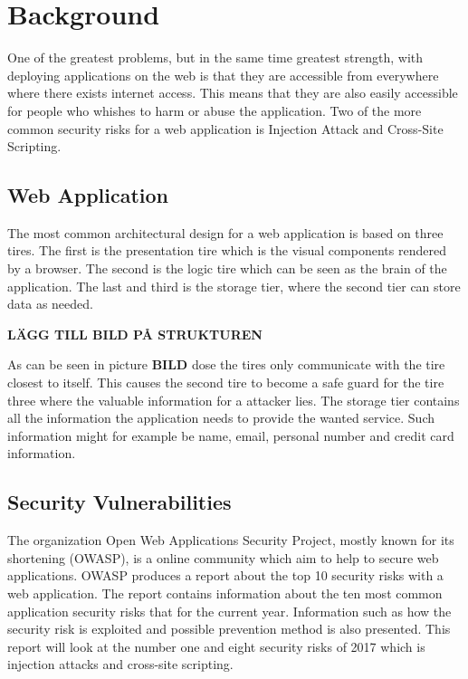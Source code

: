 \chapter{Background}
One of the greatest problems, but in the same time greatest strength, with deploying applications on the web is that they are accessible from everywhere where there exists internet access. This means that they are also easily accessible for people who whishes to harm or abuse the application. Two of the more common security risks for a web application is Injection Attack and Cross-Site Scripting. \parencite{OpenWebApplicationSecurityProject, CrossMichael2007Dgtw}


\section{Web Application}
The most common architectural design for a web application is based on three tires. The first is the presentation tire which is the visual components rendered by a browser. The second is the logic tire which can be seen as the brain of the application. The last and third is the storage tier, where the second tier can store data as needed. \parencite{JustinClarke-Salt2009SIAa} 

\textbf{LÄGG TILL BILD PÅ STRUKTUREN}

As can be seen in picture \textbf{BILD} dose the tires only communicate with the tire closest to itself. This causes the second tire to become a safe guard for the tire three where the valuable information for a attacker lies. The storage tier contains all the information the application needs to provide the wanted service. Such information might for example be name, email, personal number and credit card information. \parencite{JustinClarke-Salt2009SIAa}

\section{Security Vulnerabilities}
The organization Open Web Applications Security Project, mostly known for its shortening (OWASP), is a online community which aim to help to secure web applications. \parencite{OpenWebApplicationSecurityProject} OWASP produces a report about the top 10 security risks with a web application. The report contains information about the ten most common application security risks that for the current year. Information such as how the security risk is exploited and possible prevention method is also presented. \parencite{OWASP2017} This report will look at the number one and eight security risks of 2017 which is injection attacks and cross-site scripting. \parencite{OWASP2017}



